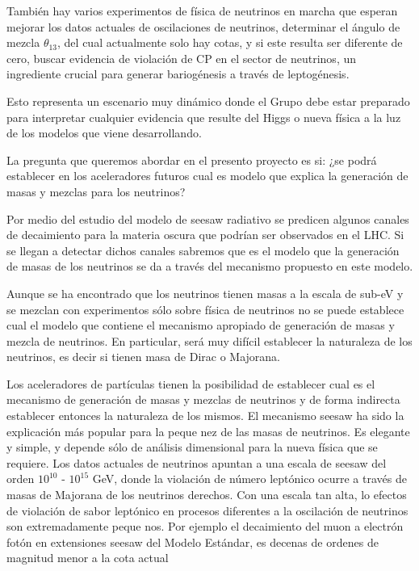 También hay varios experimentos de física de neutrinos en marcha que esperan mejorar los datos actuales de oscilaciones de neutrinos, determinar el ángulo de mezcla $\theta_{13}$, del cual actualmente solo hay cotas, y si este resulta ser diferente de cero, buscar evidencia de violación de CP en el sector de neutrinos, un ingrediente crucial para generar bariogénesis a través de leptogénesis.

Esto representa un escenario muy dinámico donde el Grupo debe estar preparado para interpretar cualquier evidencia que resulte del Higgs o nueva física a la luz de los modelos que viene desarrollando. 
	
La pregunta que queremos abordar en el presento proyecto es si: 
¿se podrá establecer en los aceleradores futuros cual es modelo que
explica la generación de masas y mezclas para los neutrinos?

Por medio del estudio del modelo de seesaw radiativo se predicen algunos canales de decaimiento para la materia oscura que podrían ser observados en el LHC. Si se llegan a detectar dichos canales sabremos que es el modelo que la generación de masas de los neutrinos se da a través del mecanismo propuesto en este modelo.

Aunque se ha encontrado que los neutrinos tienen masas a la escala de
sub-eV y se mezclan %
con experimentos sólo sobre
física de neutrinos no se puede establece cual el modelo que contiene
el mecanismo apropiado de generación de masas y mezcla de neutrinos.
En particular, será muy difícil establecer la naturaleza de los
neutrinos, es decir si tienen masa de Dirac o Majorana.

Los aceleradores de partículas tienen la posibilidad de
establecer cual es el mecanismo de generación de masas y mezclas de
neutrinos y de forma indirecta establecer entonces la naturaleza de
los mismos. El mecanismo seesaw %
ha sido la
explicación más popular para la peque nez de las masas de neutrinos. Es
elegante y simple, y depende sólo de análisis dimensional para la
nueva física que se requiere. Los datos actuales de neutrinos
apuntan a una escala de seesaw del orden $10^{10}$ - $10^{15}$ GeV,
donde la violación de número leptónico ocurre a través de masas de
Majorana de los neutrinos derechos. Con una escala tan alta, lo
efectos de violación de sabor leptónico en procesos diferentes a la
oscilación de neutrinos son extremadamente peque nos. Por ejemplo el
decaimiento del muon a electrón fotón en extensiones seesaw del Modelo
Estándar, es decenas de ordenes de magnitud menor a la cota actual

